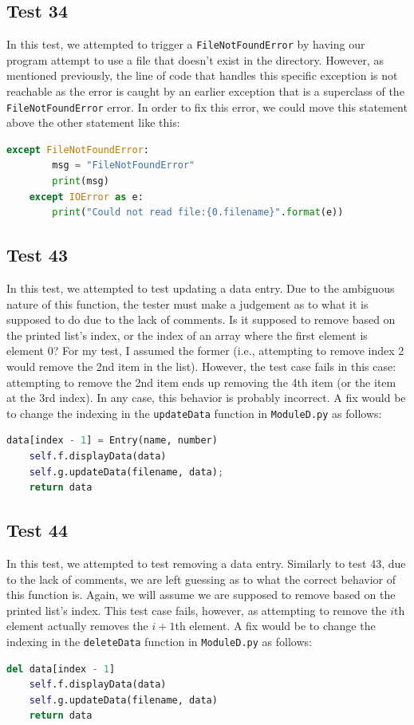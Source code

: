 \documentclass[12pt, letterpaper, titlepage]{article}
\begin{document}
\subsection*{Test 34}
In this test, we attempted to trigger a \lstinline{FileNotFoundError} by having our program attempt to use a file that doesn't exist in the directory. However, as mentioned previously, the line of code that handles this specific exception is not reachable as the error is caught by an earlier exception that is a superclass of the \lstinline{FileNotFoundError} error. In order to fix this error, we could move this statement above the other statement like this:
\begin{lstlisting}[language=Python, style=style]
    except FileNotFoundError:
        msg = "FileNotFoundError"
        print(msg)
    except IOError as e:
        print("Could not read file:{0.filename}".format(e))
\end{lstlisting}

\subsection*{Test 43}
In this test, we attempted to test updating a data entry. Due to the ambiguous nature of this function, the tester must make a judgement as to what it is supposed to do due to the lack of comments. Is it supposed to remove based on the printed list's index, or the index of an array where the first element is element 0? For my test, I assumed the former (i.e., attempting to remove index 2 would remove the 2nd item in the list). However, the test case fails in this case: attempting to remove the 2nd item ends up removing the 4th item (or the item at the 3rd index). In any case, this behavior is probably incorrect. A fix would be to change the indexing in the \lstinline{updateData} function in \lstinline{ModuleD.py} as follows:
\begin{lstlisting}[language=Python, style=style]
    data[index - 1] = Entry(name, number)
    self.f.displayData(data)
    self.g.updateData(filename, data);
    return data
\end{lstlisting}

\subsection*{Test 44}
In this test, we attempted to test removing a data entry. Similarly to test 43, due to the lack of comments, we are left guessing as to what the correct behavior of this function is. Again, we will assume we are supposed to remove based on the printed list's index. This test case fails, however, as attempting to remove the $i$th element actually removes the $i+1$th element. A fix would be to change the indexing in the \lstinline{deleteData} function in \lstinline{ModuleD.py} as follows:
\begin{lstlisting}[language=Python, style=style]
    del data[index - 1]
    self.f.displayData(data)
    self.g.updateData(filename, data)
    return data
\end{lstlisting}
\end{document}
